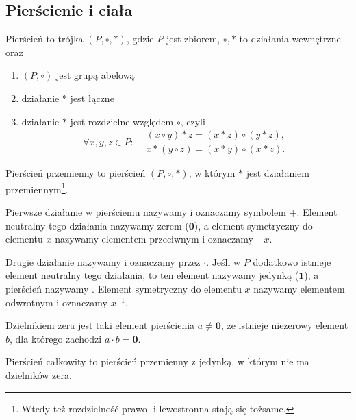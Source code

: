 \subsection{Pierścienie i ciała}
\begin{definition}
    Pierścień to trójka $(P, \circ, *)$, gdzie $P$ jest zbiorem, $\circ, *$ to działania wewnętrzne oraz
    \begin{enumerate}
        \item $(P, \circ)$ jest grupą abelową
        \item działanie $*$ jest łączne
        \item działanie $*$ jest rozdzielne względem $\circ$, czyli
        $$\forall x, y, z \in P : \begin{aligned}& (x \circ y) * z = (x * z) \circ (y * z), \\
                                                 & x * (y \circ z) = (x * y) \circ (x * z).\end{aligned} $$
    \end{enumerate}
\end{definition}

\begin{definition}
    Pierścień przemienny to pierścień $(P, \circ, *)$, w którym $*$ jest działaniem przemiennym\footnote{Wtedy też rozdzielność prawo- i lewostronna stają się tożsame.}.
\end{definition}

Pierwsze działanie w pierścieniu nazywamy  i oznaczamy symbolem $+$. Element neutralny tego działania nazywamy zerem ($\symbf{0}$), a element symetryczny do elementu $x$ nazywamy elementem przeciwnym i oznaczamy $-x$.

Drugie działanie nazywamy  i oznaczamy przez $\cdot$. Jeśli w $P$ dodatkowo istnieje element neutralny tego działania, to ten element nazywamy jedynką ($\symbf{1}$), a pierścień nazywamy . Element symetryczny do elementu $x$ nazywamy elementem odwrotnym i oznaczamy $x^{-1}$.

\begin{definition}
    Dzielnikiem zera jest taki element pierścienia $a \neq \symbf{0}$, że istnieje niezerowy element $b$, dla którego zachodzi $a \cdot b = \symbf{0}$.
\end{definition}

\begin{definition}
    Pierścień całkowity to pierścień przemienny z jedynką, w którym nie ma dzielników zera.
\end{definition}

